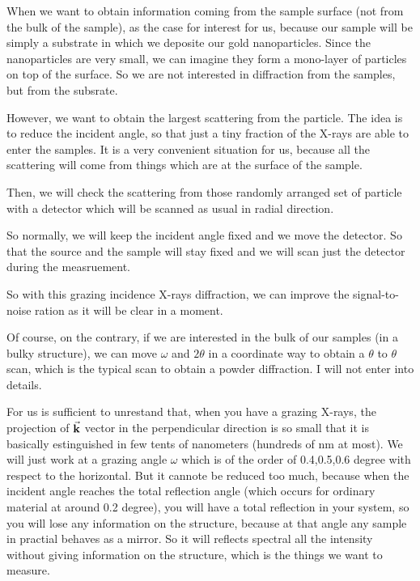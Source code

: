 \documentclass[../main/main.tex]{subfiles}
\begin{document}
When we want to obtain information coming from the sample surface (not from the bulk of the sample), as the case for interest for us, because our sample will be simply a substrate in which we deposite our gold nanoparticles. Since the nanoparticles are very small, we can imagine they form a mono-layer of particles on top of the surface. So we are not interested in diffraction from the samples, but from the subsrate.

However, we want to obtain the largest scattering from the particle. The idea is to reduce the incident angle, so that just a tiny fraction of the X-rays are able to enter the samples. It is a very convenient situation for us, because all the scattering will come from things which are at the surface of the sample.

Then, we will check the scattering from those randomly arranged set of particle with a detector which will be scanned as usual in radial direction.

So normally, we will keep the incident angle fixed and we move the detector. So that the source and the sample will stay fixed and we will scan just the detector during the measruement.

So with this grazing incidence X-rays diffraction, we can improve the signal-to-noise ration as it will be clear in a moment.

Of course, on the contrary, if we are interested in the bulk of our samples  (in a bulky structure), we can move \( \omega  \) and \( 2 \theta  \) in a coordinate way to obtain a \( \theta  \) to \( \theta  \) scan, which is the typical scan to obtain a powder diffraction. I will not enter into details.

For us is sufficient to unrestand that, when you have a grazing X-rays, the projection of \( \va{k} \) vector in the perpendicular direction is so small that it is basically estinguished in few tents of nanometers (hundreds of nm at most).
We will just work at a grazing angle \( \omega  \) which is of the order of 0.4,0.5,0.6 degree with respect to the horizontal.
But it cannote be reduced too much, because when the incident angle reaches the total reflection angle (which occurs for ordinary material at around 0.2 degree), you will have a total reflection in your system, so you will lose any information on the structure, because at that angle any sample in practial behaves as a mirror. So it will reflects spectral all the intensity without giving information on the structure, which is the things we want to measure.
\end{document}
